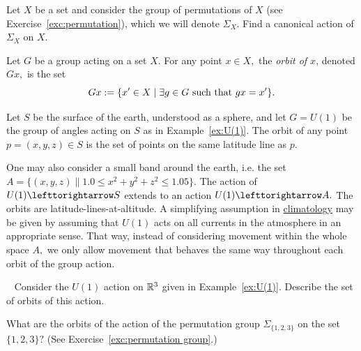 \documentclass[CT4S-EN-RU]{subfiles}
\begin{document}
\begin{exampleRUS}\label{ex:U(1)}
\end{exampleRUS}

\begin{exerciseENG}\label{exc:permutation group}
Let $X$ be a set and consider the group of permutations of $X$ (see Exercise~\ref{exc:permutation}), which we will denote $\Sigma_X$. Find a canonical action of $\Sigma_X$ on $X.$
\end{exerciseENG}

\begin{exerciseRUS}\label{exc:permutation group}
\end{exerciseRUS}

\begin{definitionENG}
Let $G$ be a group acting on a set $X.$ For any point $x\in X,$ the {\em orbit of $x$}, denoted $Gx,$ is the set 
$$Gx:=\{x'\in X{\;|\;}\exists g\in G \textnormal{ such that }gx=x'\}.$$
\end{definitionENG}

\begin{definitionRUS}
\end{definitionRUS}

\begin{applicationENG}
Let $S$ be the surface of the earth, understood as a sphere, and let $G=U(1)$ be the group of angles acting on $S$ as in Example~\ref{ex:U(1)}. The orbit of any point $p=(x,y,z)\in S$ is the set of points on the same latitude line as $p.$

One may also consider a small band around the earth, i.e. the set $A=\{(x,y,z)\|1.0\leq x^2+y^2+z^2\leq 1.05\}.$ The action of $U(1)\acts S$ extends to an action $U(1)\acts A.$ The orbits are latitude-lines-at-altitude. A simplifying assumption in \href{http://en.wikipedia.org/wiki/Climatology}{\text climatology} may be given by assuming that $U(1)$ acts on all currents in the atmosphere in an appropriate sense. That way, instead of considering movement within the whole space $A,$ we only allow movement that behaves the same way throughout each orbit of the group action.
\end{applicationENG}

\begin{applicationRUS}
\end{applicationRUS}

\begin{exerciseENG}~
\sexc Consider the $U(1)$ action on ${\mathbb R}^3$ given in Example~\ref{ex:U(1)}. Describe the set of orbits of this action.
\item What are the orbits of the action of the permutation group $\Sigma_{\{1,2,3\}}$ on the set $\{1,2,3\}?$ (See Exercise~\ref{exc:permutation group}.)
\endsexc
\end{exerciseENG}
\end{document}
